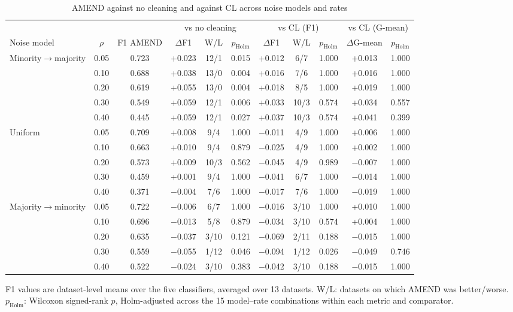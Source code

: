 \documentclass[conference]{IEEEtran}
\begin{document}
\begin{table}[!t]
\centering
\footnotesize
\caption{AMEND against no cleaning and against CL across noise models and rates}
\label{tab:6}
\setlength{\tabcolsep}{3.5pt}
\begin{adjustbox}{max width=\linewidth}
\begin{tabular}{lcccccccccc}
\hline
&  &  & \multicolumn{3}{c}{vs no cleaning} & \multicolumn{3}{c}{vs CL (F1)} & \multicolumn{2}{c}{vs CL (G-mean)} \\
Noise model & $\rho $ & F1 AMEND & $\Delta $F1 & W/L & $p_{\mathrm{Holm}}$ & $\Delta $F1 & W/L & $p_{\mathrm{Holm}}$ & $\Delta $G-mean & $p_{\mathrm{Holm}}$ \\
\hline
Minority$\rightarrow $majority & 0.05 & 0.723 & +0.023 & 12/1 & 0.015 & +0.012 & 6/7 & 1.000 & +0.013 & 1.000 \\
& 0.10 & 0.688 & +0.038 & 13/0 & 0.004 & +0.016 & 7/6 & 1.000 & +0.016 & 1.000 \\
& 0.20 & 0.619 & +0.055 & 13/0 & 0.004 & +0.018 & 8/5 & 1.000 & +0.019 & 1.000 \\
& 0.30 & 0.549 & +0.059 & 12/1 & 0.006 & +0.033 & 10/3 & 0.574 & +0.034 & 0.557 \\
& 0.40 & 0.445 & +0.059 & 12/1 & 0.027 & +0.037 & 10/3 & 0.574 & +0.041 & 0.399 \\
Uniform & 0.05 & 0.709 & +0.008 & 9/4 & 1.000 & $-$0.011 & 4/9 & 1.000 & +0.006 & 1.000 \\
& 0.10 & 0.663 & +0.010 & 9/4 & 0.879 & $-$0.025 & 4/9 & 1.000 & +0.002 & 1.000 \\
& 0.20 & 0.573 & +0.009 & 10/3 & 0.562 & $-$0.045 & 4/9 & 0.989 & $-$0.007 & 1.000 \\
& 0.30 & 0.459 & +0.001 & 9/4 & 1.000 & $-$0.041 & 6/7 & 1.000 & $-$0.014 & 1.000 \\
& 0.40 & 0.371 & $-$0.004 & 7/6 & 1.000 & $-$0.017 & 7/6 & 1.000 & $-$0.019 & 1.000 \\
Majority$\rightarrow $minority & 0.05 & 0.722 & $-$0.006 & 6/7 & 1.000 & $-$0.016 & 3/10 & 1.000 & +0.010 & 1.000 \\
& 0.10 & 0.696 & $-$0.013 & 5/8 & 0.879 & $-$0.034 & 3/10 & 0.574 & +0.004 & 1.000 \\
& 0.20 & 0.635 & $-$0.037 & 3/10 & 0.121 & $-$0.069 & 2/11 & 0.188 & $-$0.015 & 1.000 \\
& 0.30 & 0.559 & $-$0.055 & 1/12 & 0.046 & $-$0.094 & 1/12 & 0.026 & $-$0.049 & 0.746 \\
& 0.40 & 0.522 & $-$0.024 & 3/10 & 0.383 & $-$0.042 & 3/10 & 0.188 & $-$0.015 & 1.000 \\
\hline
\end{tabular}
\end{adjustbox}
\par\vspace{3pt}
\begin{minipage}{\linewidth}\scriptsize F1 values are dataset-level means over the five classifiers, averaged over 13 datasets. W/L: datasets on which AMEND was better/worse. $p_{\mathrm{Holm}}$: Wilcoxon signed-rank $p$, Holm-adjusted across the 15 model--rate combinations within each metric and comparator.\end{minipage}
\end{table}
\end{document}
